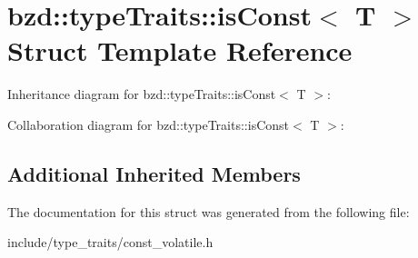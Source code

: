 \hypertarget{structbzd_1_1typeTraits_1_1isConst}{}\section{bzd\+:\+:type\+Traits\+:\+:is\+Const$<$ T $>$ Struct Template Reference}
\label{structbzd_1_1typeTraits_1_1isConst}


Inheritance diagram for bzd\+:\+:type\+Traits\+:\+:is\+Const$<$ T $>$\+:


Collaboration diagram for bzd\+:\+:type\+Traits\+:\+:is\+Const$<$ T $>$\+:
\subsection*{Additional Inherited Members}


The documentation for this struct was generated from the following file\+:\begin{DoxyCompactItemize}
\item 
include/type\+\_\+traits/const\+\_\+volatile.\+h\end{DoxyCompactItemize}
